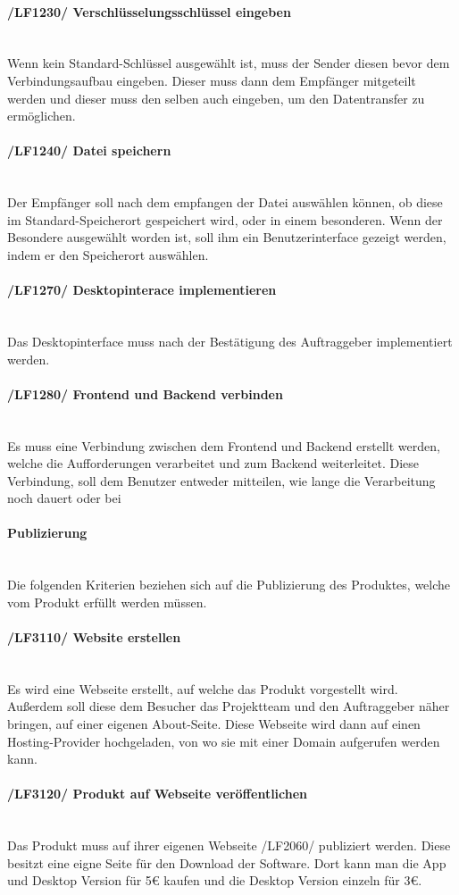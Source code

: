 \begin{indentE}
	\paragraph{/LF1230/ Verschlüsselungsschlüssel eingeben}\mbox{}\\
	Wenn kein Standard-Schlüssel ausgewählt ist, muss der Sender diesen bevor dem Verbindungsaufbau eingeben. Dieser muss dann dem Empfänger mitgeteilt werden und dieser muss den selben auch eingeben, um den Datentransfer zu ermöglichen.
	\paragraph{/LF1240/ Datei speichern}\mbox{}\\
	Der Empfänger soll nach dem empfangen der Datei auswählen können, ob diese im Standard-Speicherort gespeichert wird, oder in einem besonderen. Wenn der Besondere ausgewählt worden ist, soll ihm ein Benutzerinterface gezeigt werden, indem er den Speicherort auswählen.
	\paragraph{/LF1270/ Desktopinterace implementieren}\mbox{}\\
	Das Desktopinterface muss nach der Bestätigung des Auftraggeber implementiert werden. 
	\paragraph{/LF1280/ Frontend und Backend verbinden}\mbox{}\\
	Es muss eine Verbindung zwischen dem Frontend und Backend erstellt werden, welche die Aufforderungen verarbeitet und zum Backend weiterleitet. Diese Verbindung, soll dem Benutzer entweder mitteilen, wie lange die Verarbeitung noch dauert oder bei
	\paragraph{Publizierung}\mbox{}\\
	Die folgenden Kriterien beziehen sich auf die Publizierung des Produktes, welche vom Produkt erfüllt werden müssen.
	\paragraph{/LF3110/ Website erstellen}\mbox{}\\
	Es wird eine Webseite erstellt, auf welche das Produkt vorgestellt wird. Außerdem soll diese dem Besucher das Projektteam und den Auftraggeber näher bringen, auf einer eigenen About-Seite. Diese Webseite wird dann auf einen Hosting-Provider hochgeladen, von wo sie mit einer Domain aufgerufen werden kann.
	\paragraph{/LF3120/ Produkt auf Webseite veröffentlichen}\mbox{}\\
	Das Produkt muss auf ihrer eigenen Webseite /LF2060/ publiziert werden. Diese besitzt eine eigne Seite für den Download der Software. Dort kann man die App und Desktop Version für 5€ kaufen und die Desktop Version einzeln für 3€.
\end{indentE}

